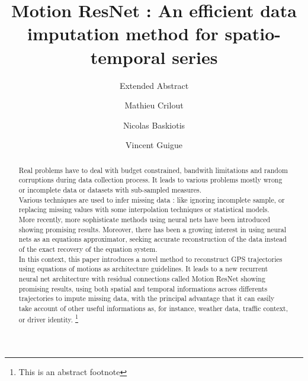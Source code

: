 \documentclass[sigconf,edbt]{acmart-edbt2020}
\begin{document}
\title{Motion ResNet : An efficient data imputation method for spatio-temporal series}
\subtitle{Extended Abstract}
  

\author{Mathieu Crilout}
\authornote{}
\orcid{}

\author{Nicolas Baskiotis}
\authornote{}

\author{Vincent Guigue}
\authornote{}

\renewcommand{\shortauthors}{}


\begin{abstract}

Real problems have to deal with budget constrained, bandwith limitations and random corruptions during data collection process. It leads to various problems mostly wrong or incomplete data or datasets with sub-sampled measures.\\
Various techniques are used to infer missing data : like ignoring incomplete sample, or replacing missing values with some interpolation techniques or statistical models.\\
More recently, more sophisticate methods using neural nets have been introduced showing promising results.
Moreover, there has been a growing interest in using neural nets as an equations approximator, seeking accurate reconstruction of the data instead of the exact recovery of the equation system.\\
In this context, this paper introduces a novel method to reconstruct GPS trajectories using equations of motions as architecture guidelines.
It leads to a new recurrent neural net architecture with residual connections called Motion ResNet showing promising results, using both spatial and temporal informations across differents trajectories to impute missing data, with the principal advantage that it can easily take account of other useful informations as, for instance, weather data, traffic context, or driver identity.
\footnote{This is an abstract footnote}
\end{abstract}
\end{document}

